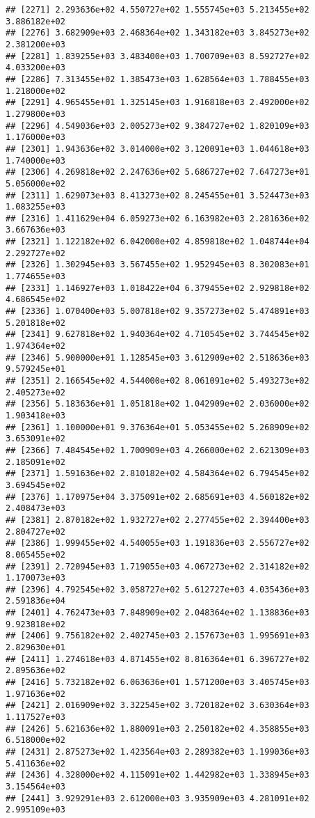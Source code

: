 \documentclass[]{article}
\begin{document}
\begin{verbatim}
## [2271] 2.293636e+02 4.550727e+02 1.555745e+03 5.213455e+02 3.886182e+02
## [2276] 3.682909e+03 2.468364e+02 1.343182e+03 3.845273e+02 2.381200e+03
## [2281] 1.839255e+03 3.483400e+03 1.700709e+03 8.592727e+02 4.033200e+03
## [2286] 7.313455e+02 1.385473e+03 1.628564e+03 1.788455e+03 1.218000e+02
## [2291] 4.965455e+01 1.325145e+03 1.916818e+03 2.492000e+02 1.279800e+03
## [2296] 4.549036e+03 2.005273e+02 9.384727e+02 1.820109e+03 1.176000e+03
## [2301] 1.943636e+02 3.014000e+02 3.120091e+03 1.044618e+03 1.740000e+03
## [2306] 4.269818e+02 2.247636e+02 5.686727e+02 7.647273e+01 5.056000e+02
## [2311] 1.629073e+03 8.413273e+02 8.245455e+01 3.524473e+03 1.083255e+03
## [2316] 1.411629e+04 6.059273e+02 6.163982e+03 2.281636e+02 3.667636e+03
## [2321] 1.122182e+02 6.042000e+02 4.859818e+02 1.048744e+04 2.292727e+02
## [2326] 1.302945e+03 3.567455e+02 1.952945e+03 8.302083e+01 1.774655e+03
## [2331] 1.146927e+03 1.018422e+04 6.379455e+02 2.929818e+02 4.686545e+02
## [2336] 1.070400e+03 5.007818e+02 9.357273e+02 5.474891e+03 5.201818e+02
## [2341] 9.627818e+02 1.940364e+02 4.710545e+02 3.744545e+02 1.974364e+02
## [2346] 5.900000e+01 1.128545e+03 3.612909e+02 2.518636e+03 9.579245e+01
## [2351] 2.166545e+02 4.544000e+02 8.061091e+02 5.493273e+02 2.405273e+02
## [2356] 5.183636e+01 1.051818e+02 1.042909e+02 2.036000e+02 1.903418e+03
## [2361] 1.100000e+01 9.376364e+01 5.053455e+02 5.268909e+02 3.653091e+02
## [2366] 7.484545e+02 1.700909e+03 4.266000e+02 2.621309e+03 2.185091e+02
## [2371] 1.591636e+02 2.810182e+02 4.584364e+02 6.794545e+02 3.694545e+02
## [2376] 1.170975e+04 3.375091e+02 2.685691e+03 4.560182e+02 2.408473e+03
## [2381] 2.870182e+02 1.932727e+02 2.277455e+02 2.394400e+03 2.804727e+02
## [2386] 1.999455e+02 4.540055e+03 1.191836e+03 2.556727e+02 8.065455e+02
## [2391] 2.720945e+03 1.719055e+03 4.067273e+02 2.314182e+02 1.170073e+03
## [2396] 4.792545e+02 3.058727e+02 5.612727e+03 4.035436e+03 2.591836e+04
## [2401] 4.762473e+03 7.848909e+02 2.048364e+02 1.138836e+03 9.923818e+02
## [2406] 9.756182e+02 2.402745e+03 2.157673e+03 1.995691e+03 2.829630e+01
## [2411] 1.274618e+03 4.871455e+02 8.816364e+01 6.396727e+02 2.895636e+02
## [2416] 5.732182e+02 6.063636e+01 1.571200e+03 3.405745e+03 1.971636e+02
## [2421] 2.016909e+02 3.322545e+02 3.720182e+02 3.630364e+03 1.117527e+03
## [2426] 5.621636e+02 1.880091e+03 2.250182e+02 4.358855e+03 6.518000e+02
## [2431] 2.875273e+02 1.423564e+03 2.289382e+03 1.199036e+03 5.411636e+02
## [2436] 4.328000e+02 4.115091e+02 1.442982e+03 1.338945e+03 3.154564e+03
## [2441] 3.929291e+03 2.612000e+03 3.935909e+03 4.281091e+02 2.995109e+03

\end{verbatim}
\end{document}
